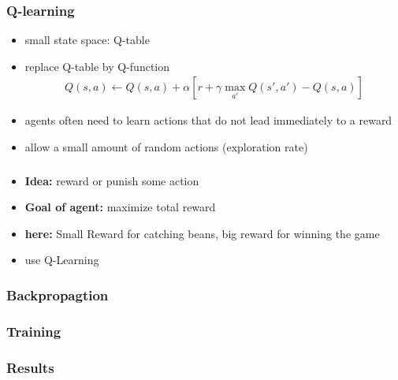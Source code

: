 \documentclass{beamer}
\begin{document}
  \begin{frame}
  \frametitle{Q-learning}
 \begin{itemize}
 \item small state space: Q-table
  \item replace Q-table by Q-function 
  \begin{align}
  Q(s,a) \leftarrow Q(s,a)+\alpha [r+\gamma \max_{a'} Q(s',a') -Q(s,a)]
  \end{align}
 \item agents often need to learn actions that do not lead immediately to a reward
 \item allow a small amount of random actions (exploration rate)
 \end{itemize}
 \end{frame}
 
 
 \begin{frame}
 \frametitle{}
 \begin{itemize}
 \item \textbf{Idea:} reward or punish some action
 \item \textbf{Goal of agent:} maximize total reward
 \item \textbf{here:} Small Reward for catching beans, big reward for winning the game
 \item use Q-Learning
 \end{itemize}
 \end{frame}
 
 \begin{frame}
 \frametitle{Backpropagtion}
 
 \end{frame}
 
 \begin{frame}
 \frametitle{Training}
 \end{frame}
 
 \begin{frame}
 \frametitle{Results}
 \end{frame}
\end{document}
